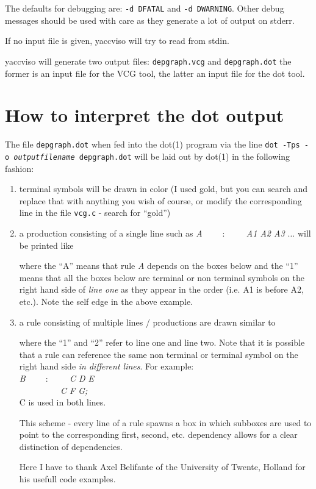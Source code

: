 \documentclass[a4paper,twocolumn]{article}
\begin{document}
The defaults for debugging are: {\tt -d DFATAL} and {\tt -d DWARNING}. Other
debug messages should be used with care as they generate a lot of output 
on stderr.

If no input file is given, yaccviso will try to read from stdin.

yaccviso will generate two output files:
{\tt depgraph.vcg} and {\tt depgraph.dot} the former is an input file for the
VCG tool, the latter an input file for the dot tool.

\section{How to interpret the dot output}
The file {\tt depgraph.dot} when fed into the dot(1) program via the line
{\tt dot -Tps -o {\sl outputfilename} depgraph.dot} will be laid out by 
dot(1) in the following fashion:

\begin{enumerate}
	\item terminal symbols will be drawn in color (I used gold, but 
	you can search and replace that with anything you wish of course, or 
	modify the corresponding line in the file {\tt vcg.c} - search for 
	``gold'')
	\item a production consisting of a single line such as 
	{\sl A $\qquad : \qquad$ A1 A2 A3 $\ldots$} will be printed
	like 
	\vskip 0.5cm
	\begin{center}
	\epsfxsize=7cm 
	\end{center}

	where the ``A'' means that rule {\sl A} depends on the boxes below and
	the ``1'' means that all the boxes below are terminal or
	non terminal symbols on the right hand side of {\em line one} as they 
	appear in the order (i.e. A1 is before A2, etc.). Note the self edge
	in the above example. 
	\item a rule consisting of multiple lines / productions are drawn 
	similar to
	\vskip 0.5cm
	\begin{center}
	\epsfxsize=7cm 
	\end{center}

	where the ``1'' and ``2'' refer to line one and line two. Note that it
	is possible that a rule can reference the same non terminal or 
	terminal symbol on the right hand side {\em in different lines}.
	For example: \\
	{\sl B $\qquad : \qquad$ C D E} \\
	{\sl \phantom{B} $\qquad \phantom{:} \qquad$ C F G;} \\
	C is used in both lines. 

	This scheme - every line of a rule spawns a box in which subboxes
	are used to point to the corresponding first, second, etc. dependency
	allows for a clear distinction of dependencies.

	Here I have to thank Axel Belifante of the University of Twente, 
	Holland for his usefull code examples.

\end{enumerate}
\end{document}
